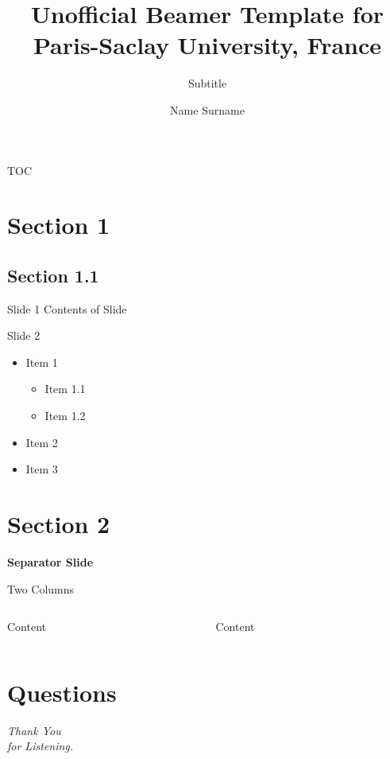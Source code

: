 \documentclass[aspectratio=169, 169]{beamer}
\title{Unofficial Beamer Template for Paris-Saclay University, France}
\subtitle{Subtitle}
\author{Name Surname}
\begin{document}
\begin{frame}
    \titlepage
\end{frame}

\begin{frame}{TOC}
	\tableofcontents
\end{frame}

\section{Section 1}
\subsection{Section 1.1}
\begin{frame}{Slide 1}
Contents of Slide 
\end{frame}

\begin{frame}{Slide 2}
\begin{itemize}
    \item Item 1 
        \begin{itemize}
            \item Item 1.1
            \item Item 1.2
        \end{itemize}
    \item Item 2
    \item Item 3 
\end{itemize}
\end{frame}


\section{Section 2}
\begin{frame}{}
    \centering
    \Huge{\textbf{Separator Slide}}
\end{frame}


\begin{frame}{Two Columns}
    \begin{columns}
        \begin{column}{0.48\linewidth}
            Content
        \end{column}
        \begin{column}{0.48\linewidth}
           Content
        \end{column}
    \end{columns}
\end{frame}



\section{Questions}
\begin{frame}
\centering \Huge
\emph{Thank You\\for Listening.}
\end{frame}
\end{document}
